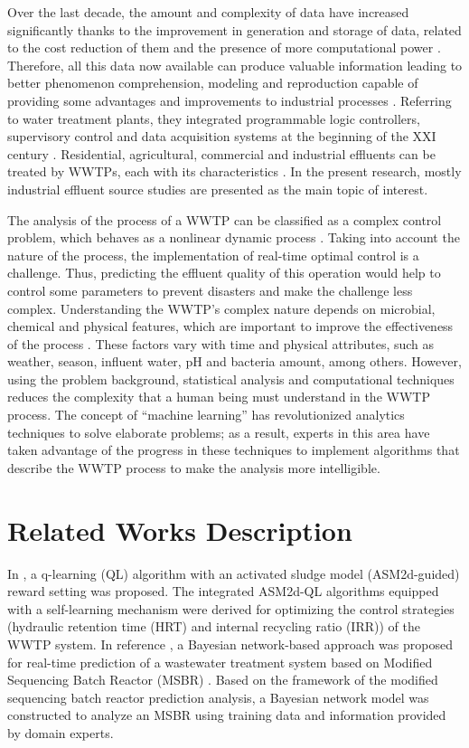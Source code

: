 Over the last decade, the amount and complexity of data have increased significantly thanks to the improvement in generation and storage of data, related to the cost reduction of them and the presence of more computational power \cite{Romero2017}. Therefore, all this data now available can produce valuable information leading to better phenomenon comprehension, modeling and reproduction capable of providing some advantages and improvements to industrial processes \cite{Sbroiavacca2018}. Referring to water treatment plants, they integrated programmable logic controllers, supervisory control and data acquisition systems at the beginning of the XXI century \cite{Newhart2019}. Residential, agricultural, commercial and industrial effluents can be treated by WWTPs, each with its characteristics \cite{Nourani2018}. In the present research, mostly industrial effluent source studies are presented as the main topic of interest.

The analysis of the process of a WWTP can be classified as a complex control problem, which behaves as a nonlinear dynamic process \cite{Pang2019}. Taking into account the nature of the process, the implementation of real-time optimal control is a challenge. Thus, predicting the effluent quality of this operation would help to control some parameters to prevent disasters and make the challenge less complex. Understanding the WWTP’s complex nature depends on microbial, chemical and physical features, which are important to improve the effectiveness of the process \cite{Li2013}. These factors vary with time and physical attributes, such as weather, season, influent water, pH and bacteria amount, among others. However, using the problem background, statistical analysis and computational techniques reduces the complexity that a human being must understand in the WWTP process. The concept of “machine learning” has revolutionized analytics techniques to solve elaborate problems; as a result, experts in this area have taken advantage of the progress in these techniques to implement algorithms that describe the WWTP process to make the analysis more intelligible.

\section{Related Works Description}
\label{s:RelatedWorks-Description}
In \cite{Pang2019}, a q-learning (QL) algorithm with an activated sludge model (ASM2d-guided) reward setting was proposed. The integrated ASM2d-QL algorithms equipped with a self-learning mechanism were derived for optimizing the control strategies (hydraulic retention time (HRT) and internal recycling ratio (IRR)) of the WWTP system. In reference \cite{Li2013}, a Bayesian network-based approach was proposed for real-time prediction of a wastewater treatment system based on Modified Sequencing Batch Reactor (MSBR) . Based on the framework of the modified sequencing batch reactor prediction analysis, a Bayesian network model was constructed to analyze an MSBR using training data and information provided by domain experts.


